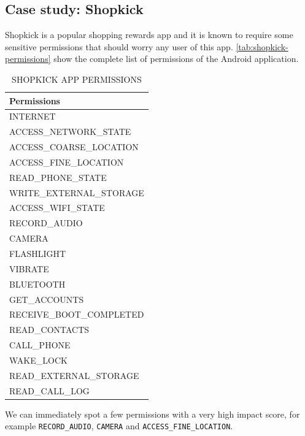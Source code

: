 \documentclass[twoside,letterpaper]{soups}
\theoremstyle{definition}
\begin{document}
\subsection{Case study: Shopkick}
Shopkick is a popular shopping rewards app and it is known \cite{shopkick-lifehacker} to require some sensitive permissions that should worry any user of this app. \autoref{tab:shopkick-permissions} show the complete list of permissions of the Android application.

\begin{table}[ht]
    \caption{SHOPKICK APP PERMISSIONS}
    \label{tab:shopkick-permissions}
    \centering
    \begin{tabular}{l}
        \toprule
            Permissions \\
            \midrule
                INTERNET \\
                ACCESS\_NETWORK\_STATE \\
                ACCESS\_COARSE\_LOCATION \\
                ACCESS\_FINE\_LOCATION \\
                READ\_PHONE\_STATE \\
                WRITE\_EXTERNAL\_STORAGE \\
                ACCESS\_WIFI\_STATE \\
                RECORD\_AUDIO \\
                CAMERA \\
                FLASHLIGHT \\
                VIBRATE \\
                BLUETOOTH \\
                GET\_ACCOUNTS \\
                RECEIVE\_BOOT\_COMPLETED \\
                READ\_CONTACTS \\
                CALL\_PHONE \\
                WAKE\_LOCK \\
                READ\_EXTERNAL\_STORAGE \\
                READ\_CALL\_LOG \\
        \bottomrule
    \end{tabular}
\end{table}

We can immediately spot a few permissions with a very high impact score, for example \texttt{RECORD\_AUDIO}, \texttt{CAMERA} and \texttt{ACCESS\_FINE\_LOCATION}.
\end{document}
